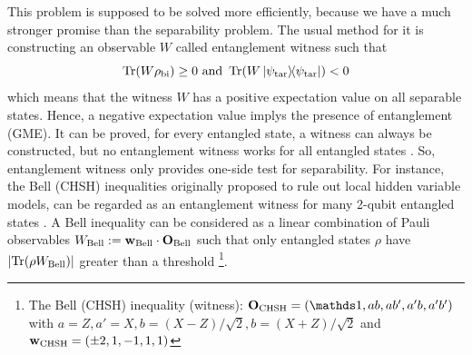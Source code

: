 \documentclass[
aps,
pra,
twocolumn,
floatfix,
]{revtex4-2}
\theoremstyle{plain}
\theoremstyle{definition}
\newtheorem{definition}{Definition}
\newtheorem{remark}{Remark}
\newcommand{\ew}{W}
\newcommand{\pob}{O}
\newcommand{\dm}{\rho}
\newcommand{\bi}{\text{bi}}
\newcommand{\target}{\textup{tar}}
\newcommand{\chsh}{\textup{CHSH}}
\newcommand{\bellineq}{\textup{Bell}}
\newcommand{\px}{X}
\newcommand{\pz}{Z}
\begin{document}
This problem is supposed to be solved more efficiently, because we have a much stronger promise than the separability problem.
The usual method for it is constructing an observable $W$ called entanglement witness such that
\begin{equation}
	\Tr(\ew\dm_{\bi}) \ge 0  \text{ and }
	\Tr(\ew\op{\psi_{\target}}) < 0 
	\label{eq:witness}
\end{equation}
which means that the witness $W$ has a positive expectation value on all separable states. 
Hence, a negative expectation value implys the presence of entanglement (GME).
It can be proved, for every entangled state, a witness can always be constructed,
but no entanglement witness works for all entangled states \cite{heinosaariMathematicalLanguageQuantum2011}.
So, entanglement witness only provides one-side test for separability.
For instance, the Bell (CHSH) inequalities originally proposed to rule out local hidden variable models,
can be regarded as an entanglement witness for many 2-qubit entangled states \cite{terhalBellInequalitiesSeparability2000}.
A Bell inequality can be considered as a linear combination of Pauli observables $\ew_{\bellineq}:=\vb{w}_{\bellineq}\cdot\vb{\pob}_{\bellineq}$
such that only entangled states $\dm$ have $\abs{\Tr(\dm\ew_{\bellineq})}$ greater than a threshold
\footnote{
	The Bell (CHSH) inequality (witness):
	$\vb{\pob}_{\chsh}=\qty(\identity, a b, a b', a' b, a' b' )$ with 
	$a = \pz, a' = \px, b = (\px-\pz)/\sqrt{2}, b = (\px+\pz)/\sqrt{2}$
	and $\vb{w}_{\chsh} = \qty(\pm 2, 1, -1, 1, 1)$
}.
\end{document}
